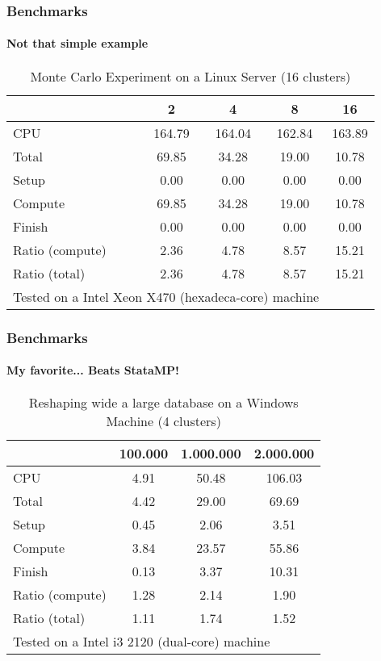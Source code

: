 \documentclass[11pt, handout]{beamer}
\def\unix1{Intel Xeon X470 (hexadeca-core)}
\def\windows1{Intel i3 2120 (dual-core)}
\begin{document}
\begin{frame}
\frametitle{Benchmarks}
\framesubtitle{Not that simple example}

\begin{table}[!h]
\centering
\caption{Monte Carlo Experiment on a Linux Server (16 clusters)}
\begin{tabular}{l*{4}{c}}\hline
& 2 &               4 &               8 &              16 \\ \hline
CPU &   164.79 &    164.04 &    162.84 &    163.89 \\
Total &    69.85 &     34.28 &     19.00 &     10.78 \\
\hspace{2mm} Setup &     0.00 &      0.00 &      0.00 &      0.00 \\
\hspace{2mm} Compute &    69.85 &     34.28 &     19.00 &     10.78 \\
\hspace{2mm} Finish &     0.00 &      0.00 &      0.00 &      0.00 \\
\hline Ratio (compute) &     2.36 &      4.78 &      8.57 &     15.21 \\
Ratio (total) &     2.36 &      4.78 &      8.57 &     15.21 \\
\hline
\multicolumn{4}{l}{\footnotesize Tested on a \unix1 machine}
\end{tabular}
\end{table}

\end{frame}

\begin{frame}
\frametitle{Benchmarks}
\framesubtitle{My favorite... Beats StataMP!}
\begin{table}[!h]
\centering
\caption{Reshaping wide a large database on a Windows Machine (4 clusters)}
\begin{tabular}{l*{3}{c}}\hline
& 100.000 &         1.000.000 &         2.000.000 \\ \hline
CPU &     4.91 &     50.48 &    106.03 \\
Total &     4.42 &     29.00 &     69.69 \\
\hspace{2mm} Setup &     0.45 &      2.06 &      3.51 \\
\hspace{2mm} Compute &     3.84 &     23.57 &     55.86 \\
\hspace{2mm} Finish &     0.13 &      3.37 &     10.31 \\
\hline Ratio (compute) &     1.28 &      2.14 &      1.90 \\
Ratio (total) &     1.11 &      1.74 &      1.52 \\
\hline
\multicolumn{4}{l}{\footnotesize Tested on a \windows1 machine}
\end{tabular}
\end{table}
\end{frame}
\end{document}
